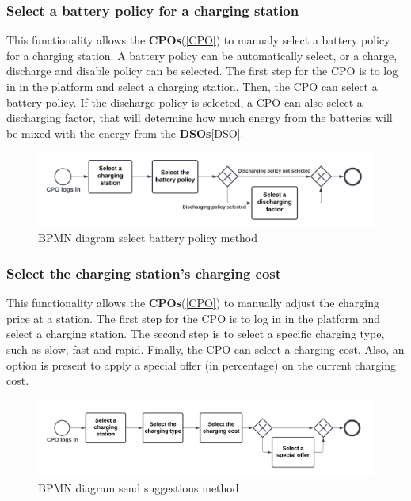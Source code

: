\subsubsection{Select a battery policy for a charging station}
This functionality allows the \textbf{CPOs}(\ref{CPO}) to manualy select a battery policy for a charging station. A battery policy can be automatically select, or a charge, discharge and disable policy can be selected. The first step for the CPO is to log in in the platform and select a charging station. Then, the CPO can select a battery policy. If the discharge policy is selected, a CPO can also select a discharging factor, that will determine how much energy from the batteries will be mixed with the energy from the \textbf{DSOs}\ref{DSO}.
\begin{figure}[H]
    \begin{center}
        \includegraphics[width=\textwidth]{img/fun-bat-pol.png}
        \caption{BPMN diagram select battery policy method}
    \end{center}
\end{figure}
\subsubsection{Select the charging station's charging cost}
This functionality allows the \textbf{CPOs}(\ref{CPO}) to manually adjust the charging price at a station. The first step for the CPO is to log in in the platform and select a charging station. The second step is to select a specific charging type, such as slow, fast and rapid. Finally, the CPO can select a charging cost. Also, an option is present to apply a special offer (in percentage) on the current charging cost.
\begin{figure}[H]
    \begin{center}
        \includegraphics[width=\textwidth]{img/fun-char-cost.png}
        \caption{BPMN diagram send suggestions method}
    \end{center}
\end{figure}
%
